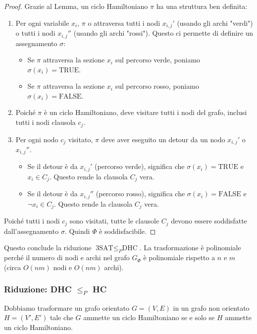 \documentclass[a4paper]{article}
\theoremstyle{definition} %
\begin{document}
\begin{proof}
Grazie al Lemma, un ciclo Hamiltoniano $\pi$ ha una struttura ben definita:
\begin{enumerate}
    \item Per ogni variabile $x_i$, $\pi$ o attraversa tutti i nodi $x_{i,j}'$ (usando gli archi "verdi") o tutti i nodi $x_{i,j}''$ (usando gli archi "rossi"). Questo ci permette di definire un assegnamento $\sigma$:
    \begin{itemize}
        \item Se $\pi$ attraversa la sezione $x_i$ sul percorso verde, poniamo $\sigma(x_i) = \text{TRUE}$.
        \item Se $\pi$ attraversa la sezione $x_i$ sul percorso rosso, poniamo $\sigma(x_i) = \text{FALSE}$.
    \end{itemize}
    \item Poiché $\pi$ è un ciclo Hamiltoniano, deve visitare tutti i nodi del grafo, inclusi tutti i nodi clausola $c_j$.
    \item Per ogni nodo $c_j$ visitato, $\pi$ deve aver eseguito un detour da un nodo $x_{i,j}'$ o $x_{i,j}''$.
    \begin{itemize}
        \item Se il detour è da $x_{i,j}'$ (percorso verde), significa che $\sigma(x_i)=\text{TRUE}$ e $x_i \in C_j$. Questo rende la clausola $C_j$ vera.
        \item Se il detour è da $x_{i,j}''$ (percorso rosso), significa che $\sigma(x_i)=\text{FALSE}$ e $\neg x_i \in C_j$. Questo rende la clausola $C_j$ vera.
    \end{itemize}
\end{enumerate}
Poiché tutti i nodi $c_j$ sono visitati, tutte le clausole $C_j$ devono essere soddisfatte dall'assegnamento $\sigma$.
Quindi $\Phi$ è soddisfacibile.
\end{proof}

Questo conclude la riduzione $\text{3SAT} \le_P \text{DHC}$. La trasformazione è polinomiale perché il numero di nodi e archi nel grafo $G_\Phi$ è polinomiale rispetto a $n$ e $m$ (circa $O(nm)$ nodi e $O(nm)$ archi).

\subsubsection{Riduzione: DHC $\le_P$ HC}

Dobbiamo trasformare un grafo orientato $G=(V, E)$ in un grafo non orientato $H=(V', E')$ tale che $G$ ammette un ciclo Hamiltoniano se e solo se $H$ ammette un ciclo Hamiltoniano.
\end{document}
